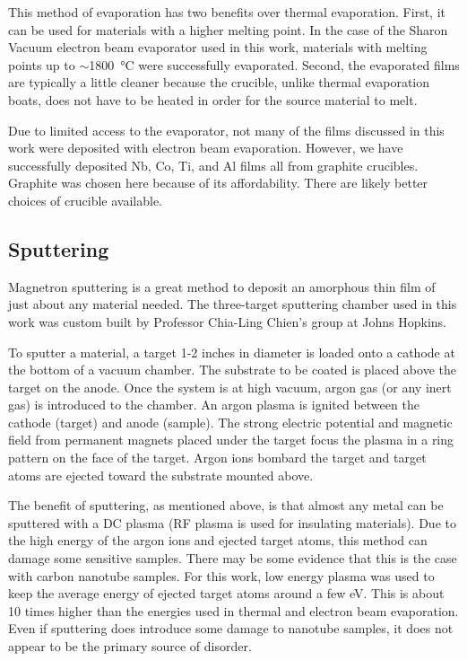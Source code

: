 This method of evaporation has two benefits over thermal evaporation. First, it can be used for materials with a higher melting point. In the case of the Sharon Vacuum electron beam evaporator used in this work, materials with melting points up to $\sim$\SI{1800}{\degreeCelsius} were successfully evaporated. Second, the evaporated films are typically a little cleaner because the crucible, unlike thermal evaporation boats, does not have to be heated in order for the source material to melt. 

Due to limited access to the evaporator, not many of the films discussed in this work were deposited with electron beam evaporation. However, we have successfully deposited Nb, Co, Ti, and Al films all from graphite crucibles. Graphite was chosen here because of its affordability. There are likely better choices of crucible available. 

\subsection{Sputtering}
\label{subsec:sputtering}

Magnetron sputtering is a great method to deposit an amorphous thin film of just about any material needed. The three-target sputtering chamber used in this work was custom built by Professor Chia-Ling Chien's group at Johns Hopkins.

To sputter a material, a target 1-2 inches in diameter is loaded onto a cathode at the bottom of a vacuum chamber. The substrate to be coated is placed above the target on the anode. Once the system is at high vacuum,  argon gas (or any inert gas) is introduced to the chamber. An argon plasma is ignited between the cathode (target) and anode (sample). The strong electric potential and magnetic field from permanent magnets placed under the target focus the plasma in a ring pattern on the face of the target. Argon ions bombard the target and target atoms are ejected toward the substrate mounted above. 

The benefit of sputtering, as mentioned above, is that almost any metal can be sputtered with a DC plasma (RF plasma is used for insulating materials). Due to the high energy of the argon ions and ejected target atoms, this method can damage some sensitive samples. There may be some evidence that this is the case with carbon nanotube samples. For this work, low energy plasma was used to keep the average energy of ejected target atoms around a few eV. This is about 10 times higher than the energies used in thermal and electron beam evaporation. Even if sputtering does introduce some damage to nanotube samples, it does not appear to be the primary source of disorder.

